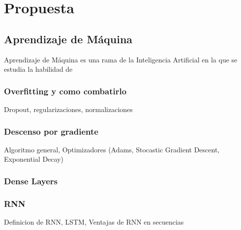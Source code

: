 \chapter{Propuesta}\label{chapter:proposal}



\section{Aprendizaje de Máquina}


Aprendizaje de Máquina es una rama de la Inteligencia Artificial en la que se estudia la habilidad de 

\subsection{Overfitting y como combatirlo}

Dropout, regularizaciones, normalizaciones

\subsection{Descenso por gradiente}

Algoritmo general, Optimizadores (Adams, Stocastic Gradient Descent, Exponential Decay)

\subsection{Dense Layers}

\subsection{RNN}

Definicion de RNN, LSTM, Ventajas de RNN en secuencias


